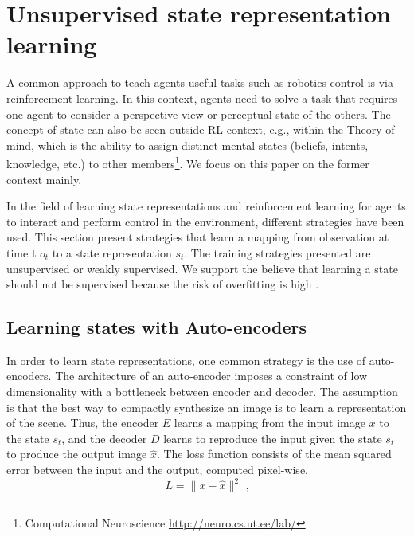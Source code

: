 \documentclass[a4paper]{article}
\newcommand{\natalia}[1]{\todo[color=green!60,inline]{#1}}
\begin{document}

\section{Unsupervised state representation learning}
\label{Sec:UnsupervisedMethods}

  A common approach to teach agents useful tasks such as robotics control is via reinforcement learning. In this context, agents need to solve a task that requires one agent to consider a perspective view or perceptual state of the others. The concept of state can also be seen outside RL context, e.g., within the Theory of mind, which is the ability to assign distinct mental states (beliefs, intents, knowledge, etc.) to other members\footnote{Computational Neuroscience \url{http://neuro.cs.ut.ee/lab/}}. We focus on this paper on the former context mainly.

In the field of learning state representations and reinforcement learning for agents to interact and perform control in the environment, different strategies have been used. This section present strategies that learn a mapping from observation at time t $o_t$ to a state representation $s_t$. The training strategies presented are unsupervised or weakly supervised. We support the believe that learning a state should not be supervised because the risk of overfitting is high \cite{Bengio12}. 

\subsection{Learning states with Auto-encoders }
In order to learn state representations, one common strategy is the use of auto-encoders. The architecture of an auto-encoder imposes a constraint of low dimensionality with a bottleneck between encoder and decoder. The assumption is that the best way to compactly synthesize an image is to learn a representation of the scene. Thus, the encoder $E$ learns a mapping from the input image $x$ to the state $s_t$, and the decoder $D$ learns to reproduce the input given the state $s_t$ to produce the output image $\hat{x}$. The loss function consists of the mean squared error between the input and the output, computed pixel-wise.
\begin{equation}
L = \parallel x - \hat{x} \parallel^2 \mbox{ ,}
\label{equation_Squared_error}
\end{equation}
\natalia{why this comma?}
\end{document}
